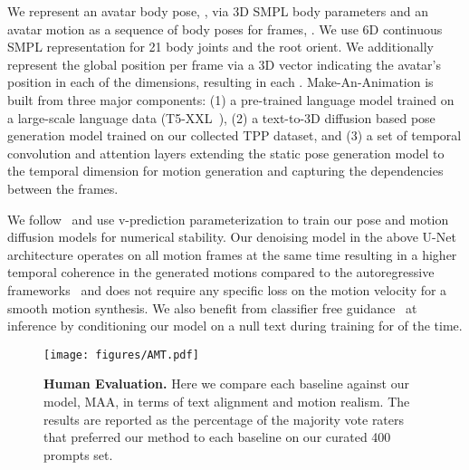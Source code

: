 \documentclass[10pt,twocolumn,letterpaper]{article}
\begin{document}
We represent an avatar body pose, , via 3D SMPL body parameters and an avatar motion as a sequence of body poses for  frames, . We use 6D continuous SMPL representation for 21 body joints and the root orient. We additionally represent the global position per frame via a 3D vector indicating the avatar's position in each of the  dimensions, resulting in each .  
Make-An-Animation is built from three major components: (1) a pre-trained language model trained on a large-scale language data (T5-XXL~\cite{t5_2020}), (2) a text-to-3D diffusion based pose generation model trained on our collected TPP dataset, and (3) a set of temporal convolution and attention layers extending the static pose generation model to the temporal dimension for motion generation and capturing the dependencies between the frames. 

We follow~\cite{ImagenVid} and use v-prediction parameterization  to train our pose and motion diffusion models for numerical stability. Our denoising model in the above U-Net architecture operates on all motion frames at the same time resulting in a higher temporal coherence in the generated motions compared to the autoregressive frameworks~\cite{tevet2022mdm} and does not require any specific loss on the motion velocity for a smooth motion synthesis.
We also benefit from classifier free guidance~\cite{cfg} at inference by conditioning our model on a null text during training for  of the time. 


\begin{figure*}
  \centering \texttt{[image: figures/AMT.pdf]}
  \caption{\textbf{Human Evaluation.} Here we compare each baseline against our model, MAA, in terms of text alignment and motion realism.
The results are reported as the percentage of the majority vote raters that
preferred our method to each baseline on our curated 400 prompts set.} 
  \label{fig:amt}
\end{figure*}
\end{document}
